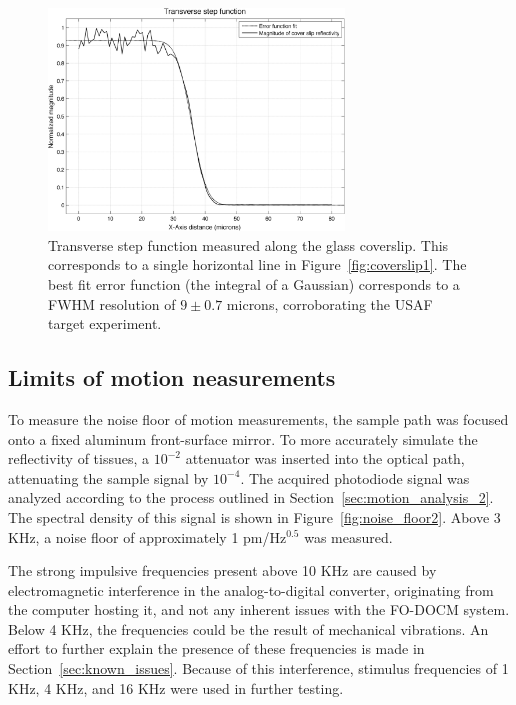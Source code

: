 \begin{figure}[h!]
\centering
\includegraphics[width=0.7\textwidth]{Images/Results/line_step.png}
\caption[Transverse step function measured along the glass coverslip.]{Transverse step function measured along the glass coverslip. This corresponds to a single horizontal line in Figure~\ref{fig:coverslip1}. The best fit error function (the integral of a Gaussian) corresponds to a FWHM resolution of $9 \pm 0.7$ microns, corroborating the USAF target experiment.\label{fig:coverslip2}}
\end{figure}

\subsection{Limits of motion neasurements}

To measure the noise floor of motion measurements, the sample path was focused onto a fixed aluminum front-surface mirror. 
To more accurately simulate the reflectivity of tissues, a $10^{-2}$ attenuator was inserted into the optical path, attenuating the sample signal by $10^{-4}$. The acquired photodiode signal was analyzed according to the process outlined in Section~\ref{sec:motion_analysis_2}. The spectral density of this signal is shown in Figure~\ref{fig:noise_floor2}.
Above 3 KHz, a noise floor of approximately 1 pm/Hz$^{0.5}$ was measured.

The strong impulsive frequencies present above 10 KHz are caused by electromagnetic interference in the analog-to-digital converter, originating from the computer hosting it, and not any inherent issues with the FO-DOCM system. Below 4 KHz, the frequencies could be the result of mechanical vibrations. An effort to further explain the presence of these frequencies is made in Section~\ref{sec:known_issues}. Because of this interference, stimulus frequencies of 1 KHz, 4 KHz, and 16 KHz were used in further testing. %

